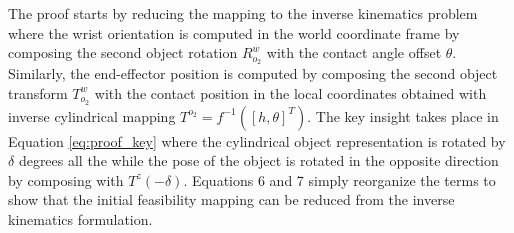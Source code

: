\documentclass{aamas2015}
\begin{document}
The proof starts by reducing the mapping to the inverse kinematics problem where the wrist orientation is computed
in the world coordinate frame by composing the second object rotation $R^w_{o_2}$ with the contact angle offset $\theta$. Similarly,
the end-effector position is computed by composing the second object transform $T^w_{o_2}$ with the contact position
in the local coordinates obtained with inverse cylindrical mapping $T^{o_2} = f^{-1}([h,\theta]^T)$. The key
insight takes place in Equation \ref{eq:proof_key} where the cylindrical object representation is rotated by $\delta$
degrees all the while the pose of the object is rotated in the opposite direction by composing with
$T^z(-\delta)$. Equations 6 and 7 simply reorganize the terms to show that the initial feasibility
mapping can be reduced from the inverse kinematics formulation.
\end{document}
